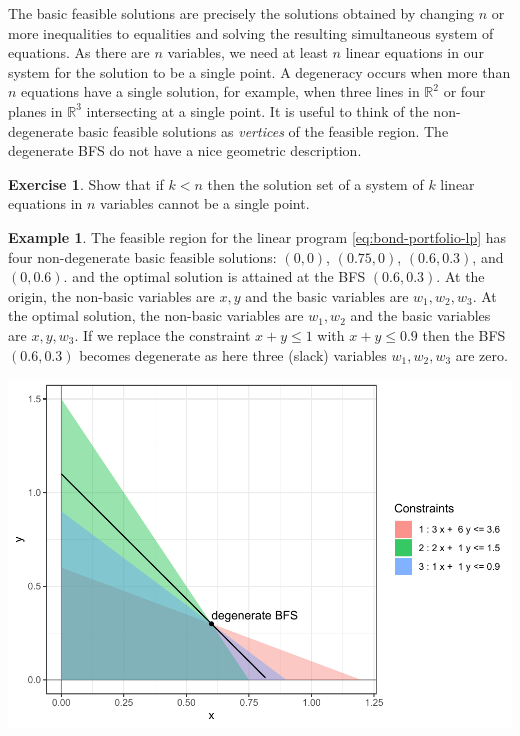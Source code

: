 \documentclass[
]{book}
\theoremstyle{definition}
\theoremstyle{definition}
\newtheorem{example}{Example}[chapter]
\theoremstyle{definition}
\newtheorem{exercise}{Exercise}[chapter]
\theoremstyle{definition}
\theoremstyle{remark}
\begin{document}
The basic feasible solutions are precisely the solutions obtained by changing \(n\) or more inequalities to equalities and solving the resulting simultaneous system of equations. As there are \(n\) variables, we need at least \(n\) linear equations in our system for the solution to be a single point. A degeneracy occurs when more than \(n\) equations have a single solution, for example, when three lines in \(\mathbb{R}^2\) or four planes in \(\mathbb{R}^3\) intersecting at a single point.
It is useful to think of the non-degenerate basic feasible solutions as \emph{vertices} of the feasible region.
The degenerate BFS do not have a nice geometric description.

\begin{exercise}
Show that if \(k < n\) then the solution set of a system of \(k\) linear equations in \(n\) variables cannot be a single point.
\end{exercise}

\begin{example}
The feasible region for the linear program \eqref{eq:bond-portfolio-lp} has four non-degenerate basic feasible solutions: \((0,0)\), \((0.75, 0)\), \((0.6, 0.3)\), and \((0, 0.6)\). and the optimal solution is attained at the BFS \((0.6, 0.3)\). At the origin, the non-basic variables are \(x, y\) and the basic variables are \(w_1, w_2, w_3\). At the optimal solution, the non-basic variables are \(w_1, w_2\) and the basic variables are \(x, y, w_3\). If we replace the constraint \(x + y \le 1\) with \(x + y \le 0.9\) then the BFS \((0.6, 0.3)\) becomes degenerate as here three (slack) variables \(w_1, w_2, w_3\) are zero.

\includegraphics{Introduction-to-Optimization_files/figure-latex/fig-bond-portfolio-degenerate-1.pdf}
\end{example}
\end{document}
